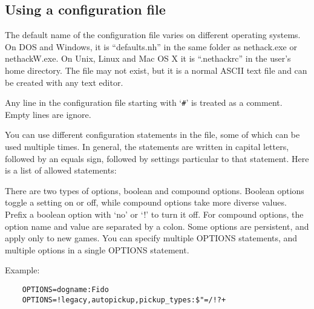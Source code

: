 \subsection*{Using a configuration file}

The default name of the configuration file varies on different
operating systems. On DOS and Windows, it is ``defaults.nh''
in the same folder as nethack.exe or nethackW.exe. On Unix, Linux
and Mac OS X it is ``.nethackrc'' in the user's home directory.
The file may not exist, but it is a normal ASCII text file and
can be created with any text editor.

Any line in the configuration file starting with `{\tt \#}' is treated as a comment.
Empty lines are ignore.

You can use different configuration statements in the file, some
of which can be used multiple times. In general, the statements are
written in capital letters, followed by an equals sign, followed by
settings particular to that statement. Here is a list of allowed statements:

\blist{}
\item[\bb{OPTIONS}]
There are two types of options, boolean and compound options.
Boolean options toggle a setting on or off, while compound options
take more diverse values.
Prefix a boolean option with `no' or `!' to turn it off.
For compound options, the option name and value are separated by a colon.
Some options are persistent, and apply only to new games.
You can specify multiple OPTIONS statements, and multiple options
in a single OPTIONS statement.

Example:
\begin{verbatim}
    OPTIONS=dogname:Fido
    OPTIONS=!legacy,autopickup,pickup_types:$"=/!?+
\end{verbatim}

